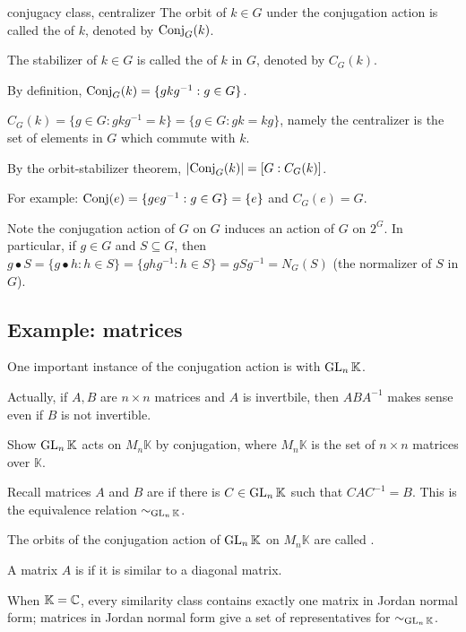 \documentclass[12pt,letterpaper]{report}
\begin{document}
\begin{defn}{conjugacy class, centralizer}{}
  The orbit of $k \in G$ under the conjugation action is called the  of $k$,
  denoted by $\operatorname{Conj}_G(k)$.

  The stabilizer of $k \in G$ is called the  of $k$ in $G$, denoted by $C_G(k)$.
\end{defn}

By definition, $\operatorname{Conj}_G(k) = \{gkg^{-1} : g \in G\}$.

$C_G(k) = \{g \in G : gkg^{-1} = k\} = \{g \in G : gk = kg\}$, namely the centralizer is the set
of elements in $G$ which commute with $k$.

By the orbit-stabilizer theorem, $\lvert\operatorname{Conj}_G(k)\rvert = [G : C_G(k)]$.

For example: $\operatorname{Conj}(e) = \{geg^{-1} : g \in G\} = \{e\}$ and $C_G(e) = G$.

Note the conjugation action of $G$ on $G$ induces an action of $G$ on $2^G$.
In particular, if $g \in G$ and $S \subseteq G$, then
$g \bullet S = \{g \bullet h : h \in S\} = \{ghg^{-1} : h \in S\} = gSg^{-1} = N_G(S)$ (the
normalizer of $S$ in $G$).

\pagebreak
\subsection{Example: matrices}

One important instance of the conjugation action is with $\operatorname{GL}_n\mathbb{K}$.

Actually, if $A, B$ are $n \times n$ matrices and $A$ is invertbile, then $ABA^{-1}$ makes sense
even if $B$ is not invertible.

\begin{exer}{}{}
  Show $\operatorname{GL}_n\mathbb{K}$ acts on $M_n\mathbb{K}$ by conjugation, where $M_n\mathbb{K}$ is the set
  of $n \times n$ matrices over $\mathbb{K}$.
\end{exer}

Recall matrices $A$ and $B$ are  if there is $C \in \operatorname{GL}_n\mathbb{K}$ such that
$CAC^{-1} = B$.
This is the equivalence relation $\sim_{\operatorname{GL}_n\mathbb{K}}$.

The orbits of the conjugation action of $\operatorname{GL}_n\mathbb{K}$ on $M_n\mathbb{K}$ are called
.

A matrix $A$ is  if it is similar to a diagonal matrix.

When $\mathbb{K} = \mathbb{C}$, every similarity class contains exactly one matrix in Jordan
normal form; matrices in Jordan normal form give a set of representatives for
$\sim_{\operatorname{GL}_n\mathbb{K}}$.
\end{document}
